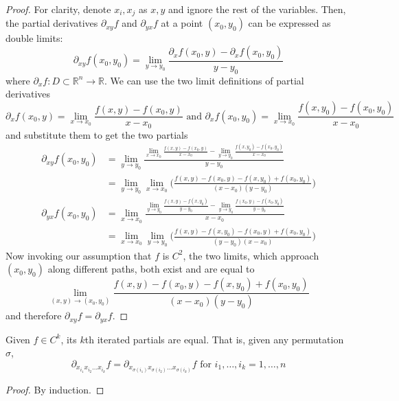   \begin{proof}
    For clarity, denote $x_i, x_j$ as $x, y$ and ignore the rest of the variables. Then, the partial derivatives $\partial_{x y} f$ and $\partial_{y x} f$ at a point $(x_0, y_0)$ can be expressed as double limits: 
    \begin{equation}
      \partial_{x y} f (x_0, y_0) = \lim_{y \rightarrow y_0} \frac{\partial_x f (x_0, y) - \partial_x f (x_0, y_0)}{y - y_0}
    \end{equation}
    where $\partial_x f: D \subset \mathbb{R}^n \longrightarrow \mathbb{R}$. We can use the two limit definitions of partial derivatives
    \begin{equation}
      \partial_x f (x_0, y) = \lim_{x \rightarrow x_0} \frac{f(x, y) - f(x_0, y)}{x-x_0} \text{ and } \partial_x f (x_0, y_0) = \lim_{x \rightarrow x_0} \frac{f(x, y_0) - f(x_0, y_0)}{x-x_0}
    \end{equation}
    and substitute them to get the two partials
    \begin{align}
      \partial_{xy} f (x_0, y_0) & = \lim_{y \rightarrow y_0} \frac{ \lim_{x \rightarrow x_0} \frac{f(x, y) - f(x_0, y)}{x-x_0} - \lim_{y \rightarrow y_0} \frac{f(x, y_0) - f(x_0, y_0)}{x-x_0}}{y - y_0} \\
      & =  \lim_{y \rightarrow y_0} \lim_{x \rightarrow x_0} \bigg( \frac{f(x, y) - f(x_0, y) - f(x, y_0) + f(x_0, y_0)}{(x - x_0) (y - y_0)} \bigg) \\
      \partial_{yx} f (x_0, y_0) & = \lim_{x \rightarrow x_0} \frac{ \lim_{y \rightarrow y_0} \frac{f(x, y) - f(x, y_0)}{y-y_0} - \lim_{y \rightarrow y_0} \frac{f(x_0, y) - f(x_0, y_0)}{y-y_0}}{x - x_0} \\
      & = \lim_{x \rightarrow x_0} \lim_{y \rightarrow y_0} \bigg( \frac{f(x, y) - f(x, y_0) - f(x_0, y) + f(x_0, y_0)}{(y-y_0) (x-x_0)} \bigg)
    \end{align}
    Now invoking our assumption that $f$ is $C^2$, the two limits, which approach $(x_0, y_0)$ along different paths, both exist and are equal to 
    \begin{equation}
      \lim_{(x, y) \rightarrow (x_0, y_0)} \frac{f(x, y) - f(x_0, y) - f(x, y_0) + f(x_0, y_0)}{(x - x_0) (y - y_0)}
    \end{equation}
    and therefore $\partial_{x y} f = \partial_{y x} f$. 
  \end{proof}

  \begin{corollary}
    Given $f \in C^k$, its $k$th iterated partials are equal. That is, given any permutation $\sigma$, 
    \begin{equation}
      \partial_{x_{i_1} x_{i_2} \ldots x_{i_k}} f = \partial_{x_{\sigma(i_1)} x_{\sigma(i_2)} \ldots x_{\sigma(i_k)}} f \text{ for } i_1, \ldots, i_k = 1, \ldots, n
    \end{equation}
  \end{corollary}
  \begin{proof}
    By induction. 
  \end{proof}

